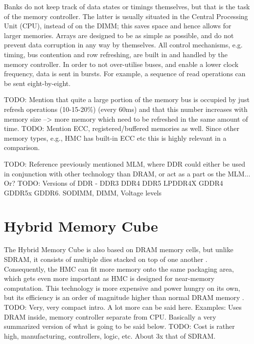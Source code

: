 Banks do not keep track of data states or timings themselves, but that is the task of the memory controller. The latter is usually situated in the Central Processing Unit (CPU), instead of on the DIMM; this saves space and hence allows for larger memories. Arrays are designed to be as simple as possible, and do not prevent data corruption in any way by themselves. All control mechanisms, e.g. timing, bus contention and row refreshing, are built in and handled by the memory controller. In order to not over-utilise buses, and enable a lower clock frequency, data is sent in bursts. For example, a sequence of read operations can be sent eight-by-eight. 

TODO: Mention that quite a large portion of the memory bus is occupied by just refresh operations (10-15-20\%) (every 60ms) and that this number increases with memory size --> more memory which need to be refreshed in the same amount of time.
TODO: Mention ECC, registered/buffered memories as well. Since other memory types, e.g., HMC has built-in ECC etc this is highly relevant in a comparison. 
\bigskip

TODO: Reference previously mentioned MLM, where DDR could either be used in conjunction with other technology than DRAM, or act as a part os the MLM... Or?
TODO: Versions of DDR - DDR3 DDR4 DDR5 LPDDR4X GDDR4 GDDR5x GDDR6. SODIMM, DIMM, Voltage levels

\section{Hybrid Memory Cube}
The Hybrid Memory Cube is also based on DRAM memory cells, but unlike SDRAM, it consists of multiple dies stacked on top of one another \cite{hybrid2013hybrid}. Consequently, the HMC can fit more memory onto the same packaging area, which gets even more important as HMC is designed for near-memory computation. This technology is more expensive and power hungry on its own, but its efficiency is an order of magnitude higher than normal DRAM memory \cite{7477494}.
TODO: Very, very compact intro. A lot more can be said here. Examples: Uses DRAM inside, memory controller separate from CPU. Basically a very summarized version of what is going to be said below.
TODO: Cost is rather high, manufacturing, controllers, logic, etc. About 3x that of SDRAM.

